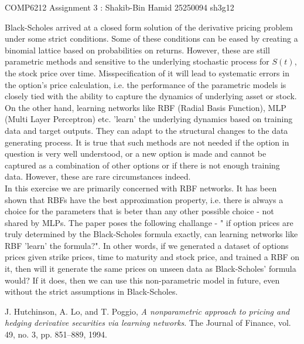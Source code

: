 \documentclass[11pt, fleqn]{article}
\begin{document}
\begin{center}

\Large{COMP6212 Assignment 3 : Shakib-Bin Hamid 25250094 sh3g12}

\end{center}

Black-Scholes arrived at a closed form solution of the derivative pricing problem under some strict conditions. Some of these conditions can be eased by creating a binomial lattice based on probabilities on returns. However, these are still parametric methods and sensitive to the underlying stochastic process for $S(t)$, the stock price over time. Misspecification of it will lead to systematic errors in the option's price calculation, i.e. the performance of the parametric models is closely tied with the ability to capture the dynamics of underlying asset or stock.\\

On the other hand, learning networks like RBF (Radial Basis Function), MLP (Multi Layer Perceptron) etc. 'learn' the underlying dynamics based on training data and target outputs. They can adapt to the structural changes to the data generating process. It is true that such methods are not needed if the option in question is very well understood, or a new option is made and cannot be captured as a combination of other options or if there is not enough training data. However, these are rare circumstances indeed.\\

In this exercise we are primarily concerned with RBF networks. It has been shown that RBFs have the best approximation property, i.e. there is always a choice for the parameters that is beter than any other possible choice - not shared by MLPs. The paper poses the following challange - " if option prices are truly determined by the Black-Scholes formula exactly, can learning networks like RBF 'learn' the formula?". In other words, if we generated a dataset of options prices given strike prices, time to maturity and stock price, and trained a RBF on it, then will it generate the same prices on unseen data as Black-Scholes' formula would? If it does, then we can use this non-parametric model in future, even without the strict assumptions in Black-Scholes.

\begin{thebibliography}{9}
J. Hutchinson, A. Lo, and T. Poggio,
\textit{A nonparametric  approach  to  pricing  and  hedging  derivative
securities via learning networks}. 
The Journal of Finance, vol. 49, no. 3, pp. 851–889, 1994.

\end{thebibliography}
\end{document}
